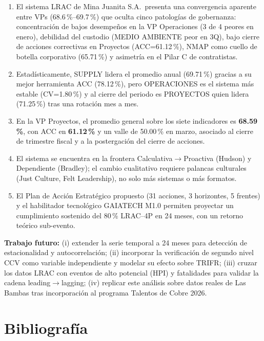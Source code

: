 \documentclass[12pt,a4paper]{article}
\begin{document}
\begin{enumerate}
\item El sistema LRAC de Mina Juanita S.A.\ presenta una convergencia aparente entre VPs (68.6\,\%--69.7\,\%) que oculta cinco patologías de gobernanza: concentración de bajos desempeños en la VP Operaciones (3 de 4 peores en enero), debilidad del custodio (MEDIO AMBIENTE peor en 3Q), bajo cierre de acciones correctivas en Proyectos (ACC=61.12\,\%), NMAP como cuello de botella corporativo (65.71\,\%) y asimetría en el Pilar C de contratistas.
\item Estadísticamente, SUPPLY lidera el promedio anual (69.71\,\%) gracias a su mejor herramienta ACC (78.12\,\%), pero OPERACIONES es el sistema más estable (CV=1.80\,\%) y al cierre del periodo es PROYECTOS quien lidera (71.25\,\%) tras una rotación mes a mes.
\item En la VP Proyectos, el promedio general sobre los siete indicadores es \textbf{68.59\,\%}, con ACC en \textbf{61.12\,\%} y un valle de 50.00\,\% en marzo, asociado al cierre de trimestre fiscal y a la postergación del cierre de acciones.
\item El sistema se encuentra en la frontera Calculativa$\to$Proactiva (Hudson) y Dependiente (Bradley); el cambio cualitativo requiere palancas culturales (Just Culture, Felt Leadership), no solo más sistemas o más formatos.
\item El Plan de Acción Estratégico propuesto (31 acciones, 3 horizontes, 5 frentes) y el habilitador tecnológico GAIATECH M1.0 permiten proyectar un cumplimiento sostenido del 80\,\% LRAC--4P en 24 meses, con un retorno teórico sub-evento.
\end{enumerate}

\textbf{Trabajo futuro:} (i) extender la serie temporal a 24 meses para detección de estacionalidad y autocorrelación; (ii) incorporar la verificación de segundo nivel CCV como variable independiente y modelar su efecto sobre TRIFR; (iii) cruzar los datos LRAC con eventos de alto potencial (HPI) y fatalidades para validar la cadena leading$\to$lagging; (iv) replicar este análisis sobre datos reales de Las Bambas tras incorporación al programa Talentos de Cobre 2026.

\section{Bibliografía}
\end{document}
